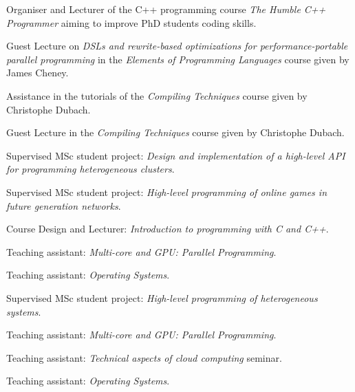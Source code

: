 \documentclass[11pt,a4paper]{moderncv}
\begin{document}
\begin{cvitemize}[\small 2015 - 2016]
    \item Organiser and Lecturer of the C++ programming course \emph{The Humble C++ Programmer} aiming to improve PhD students coding skills.
    \item Guest Lecture on \emph{\small DSLs and rewrite-based optimizations for performance-portable parallel programming} in the \emph{Elements of Programming Languages} course given by James Cheney.
    \item Assistance in the tutorials of the \emph{Compiling Techniques} course given by Christophe Dubach.
\end{cvitemize}

\begin{cvitemize}[\small 2014 - 2015]
    \item Guest Lecture in the \emph{Compiling Techniques} course given by Christophe Dubach.
\end{cvitemize}


\begin{cvitemize}[\small 2013 - 2014]
  \item Supervised MSc student project:
        \emph{Design and implementation of a high-level API for programming heterogeneous clusters}.
    \item Supervised MSc student project:
        \emph{High-level programming of online games in future generation networks}.
\end{cvitemize}

\begin{cvitemize}[\small 2012 - 2013]
    \item  Course Design and Lecturer:
        \emph{Introduction to programming with C and C++}.
      \item    Teaching assistant:
        \emph{Multi-core and GPU\@: Parallel Programming}.
    \item Teaching assistant:
        \emph{Operating Systems}.
\end{cvitemize}

\begin{cvitemize}[\small 2011 - 2012]
    \item Supervised MSc student project:
        \emph{High-level programming of heterogeneous systems}.
      \item Teaching assistant:
        \emph{Multi-core and GPU\@: Parallel Programming}.
    \item Teaching assistant:
        \emph{Technical aspects of cloud computing} seminar.
      \item Teaching assistant:
        \emph{Operating Systems}.
\end{cvitemize}
\end{document}
